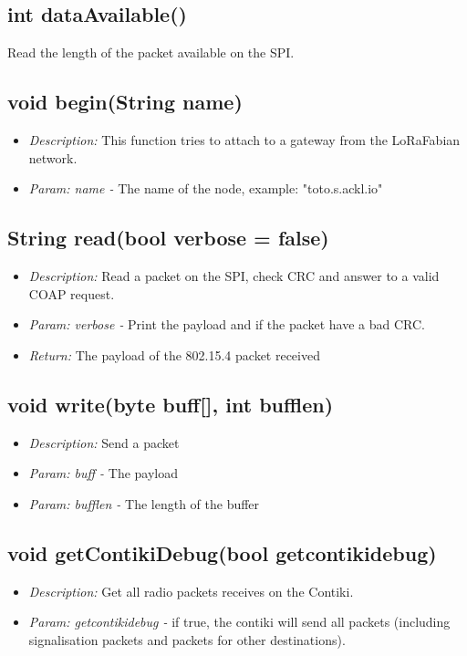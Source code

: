 \documentclass{article}
\begin{document}
\subsection{int dataAvailable()}
Read the length of the packet available on the SPI.
\subsection{void begin(String name)}
\begin{itemize}
  \item \emph{Description:} This function tries to attach to a gateway from the LoRaFabian network.
  \item \emph{Param: name -} The name of the node, example: "toto.s.ackl.io"
\end{itemize}
\subsection{String read(bool verbose = false)}
\begin{itemize}
  \item \emph{Description:} Read a packet on the SPI, check CRC and answer to a valid COAP request.
  \item \emph{Param: verbose -} Print the payload and if the packet have a bad CRC.
  \item \emph{Return:} The payload of the 802.15.4 packet received
\end{itemize}
\subsection{void write(byte buff[], int bufflen)}
\begin{itemize}
  \item \emph{Description:} Send a packet
  \item \emph{Param: buff -} The payload
  \item \emph{Param: bufflen -} The length of the buffer
\end{itemize}
\subsection{void getContikiDebug(bool getcontikidebug)}
\begin{itemize}
  \item \emph{Description:} Get all radio packets receives on the Contiki.
  \item \emph{Param: getcontikidebug -} if true, the contiki will send all packets (including signalisation packets and packets for other destinations).
\end{itemize}
\end{document}
